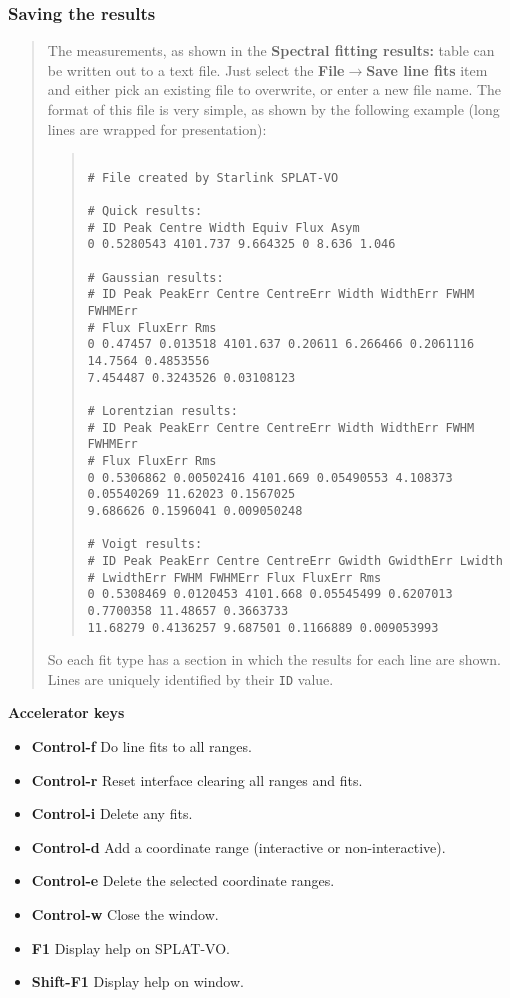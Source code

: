\documentclass[twoside,11pt]{article}
\newcommand{\latexhtml}[2]{#1}
\renewcommand{\_}{\texttt{\symbol{95}}}
\newcommand{\SPLAT}{\textsf{SPLAT-VO}}
\newcommand{\submenuitem}[2]{\latexhtml{\textbf{#1$\rightarrow$#2}}{\textbf{#1->#2}}}
\newcommand{\labelitem}[1]{\textbf{#1}}
\newcommand{\hitext}[1]{\texttt{#1}}
\newcommand{\subheading}[1]{\textbf{\large{#1}}}
\begin{document}
\subsubsection{Saving the results}
\begin{quote}
 The measurements, as shown in the \labelitem{Spectral fitting
 results:} table can be written out to a text file. Just select the
 \submenuitem{File}{Save line fits} item and either pick an existing file
 to overwrite, or enter a new file name. The format of this file is
 very simple, as shown by the following example (long lines are wrapped
 for presentation):
 \begin{quote}
  \begin{verbatim}

# File created by Starlink SPLAT-VO

# Quick results:
# ID Peak Centre Width Equiv Flux Asym
0 0.5280543 4101.737 9.664325 0 8.636 1.046

# Gaussian results:
# ID Peak PeakErr Centre CentreErr Width WidthErr FWHM FWHMErr
# Flux FluxErr Rms
0 0.47457 0.013518 4101.637 0.20611 6.266466 0.2061116 14.7564 0.4853556
7.454487 0.3243526 0.03108123

# Lorentzian results:
# ID Peak PeakErr Centre CentreErr Width WidthErr FWHM FWHMErr
# Flux FluxErr Rms
0 0.5306862 0.00502416 4101.669 0.05490553 4.108373 0.05540269 11.62023 0.1567025
9.686626 0.1596041 0.009050248

# Voigt results:
# ID Peak PeakErr Centre CentreErr Gwidth GwidthErr Lwidth
# LwidthErr FWHM FWHMErr Flux FluxErr Rms
0 0.5308469 0.0120453 4101.668 0.05545499 0.6207013 0.7700358 11.48657 0.3663733
11.68279 0.4136257 9.687501 0.1166889 0.009053993

  \end{verbatim}
 \end{quote}
 So each fit type has a section in which the results for each line are
 shown. Lines are uniquely identified by their \hitext{ID} value.
\end{quote}

\subheading{Accelerator keys}

\begin{itemize}
\item \labelitem{Control-f} Do line fits to all ranges.
\item \labelitem{Control-r} Reset interface clearing all ranges and fits.
\item \labelitem{Control-i} Delete any fits.

\item \labelitem{Control-d} Add a coordinate range (interactive or non-interactive).
\item \labelitem{Control-e} Delete the selected coordinate ranges.

\item \labelitem{Control-w} Close the window.
\item \labelitem{F1} Display help on \SPLAT.
\item \labelitem{Shift-F1} Display help on window.
\end{itemize}
\end{document}
